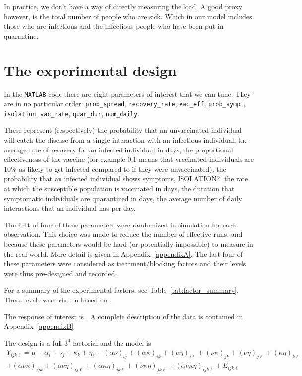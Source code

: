 \documentclass[12pt,a4paper]{article}
\begin{document}
In practice, we don't have a way of directly measuring the load. A good proxy however, is the total number of people who are sick. Which in our model includes those who are infectious and the infectious people who have been put in quarantine.

\section{The experimental design}\label{section2}

In the \verb`MATLAB` code there are eight parameters of interest that we can tune. They are in no particular order:  \verb`prob_spread`, \verb`recovery_rate`, \verb`vac_eff`, \verb`prob_sympt`,  \verb`isolation`,  \verb`vac_rate`, \verb`quar_dur`, \verb`num_daily`.

These represent (respectively) the probability that an unvaccinated individual will catch the disease from a single interaction with an infectious individual, the average rate of recovery for an infected individual in days, the proportional effectiveness of the vaccine (for example 0.1 means that vaccinated individuals are 10\% as likely to get infected compared to if they were unvaccinated), the probability that an infected individual shows symptoms, ISOLATION?, the rate at which the susceptible population is vaccinated in days, the duration that symptomatic individuals are quarantined in days, the average number of daily interactions that an individual has per day. 

The first of four of these parameters were randomized in simulation for each observation. This choice was made to reduce the number of effective runs, and because these parameters would be hard (or potentially impossible) to measure in the real world. More detail is given in Appendix~\ref{appendixA}. The last four of these parameters were considered as treatment/blocking factors and their levels were thus pre-designed and recorded. 

For a summary of the experimental factors, see Table~\ref{tab:factor_summary}. These levels were chosen based on \underline{\phantom{aaaa}}. 

The response of interest is \underline{\phantom{aaaa}}. A complete description of the data is contained in Appendix~\ref{appendixB}

The design is a full $3^4$ factorial and the model is
\vspace*{-3mm}
\begin{align*}
	Y_{ijk\ell}=\mu+\alpha_i+\nu_j+\kappa_k+\eta_\ell+(\alpha\nu)_{ij}+(\alpha\kappa)_{ik}+(\alpha\eta)_{i\ell}+(\nu\kappa)_{jk}+(\nu\eta)_{j\ell} + (\kappa\eta)_{k\ell}\\
	+(\alpha\nu\kappa)_{ijk}+(\alpha\nu\eta)_{ij\ell}+(\alpha\kappa\eta)_{ik\ell} + (\nu\kappa\eta)_{jk\ell} + (\alpha\nu\kappa\eta)_{ijk\ell}+E_{ijk\ell}
\end{align*}
\vspace*{-10mm}
\end{document}
